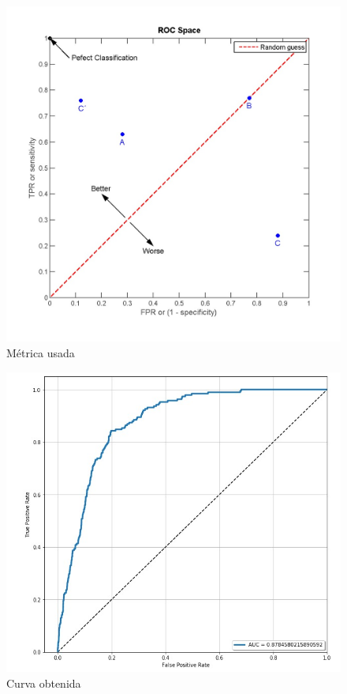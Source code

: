 \documentclass[a4paper ,12pt]{article}
\begin{document}
\begin{figure}[H]
	\centering
	\includegraphics[width=\textwidth]{roc_auc}
	\caption{\label{fig:01} Métrica usada }
\end{figure}

\begin{figure}[H]
	\centering
	\includegraphics[width=\textwidth]{roc_propia}
	\caption{\label{fig:02} Curva obtenida }
\end{figure}
\end{document}
